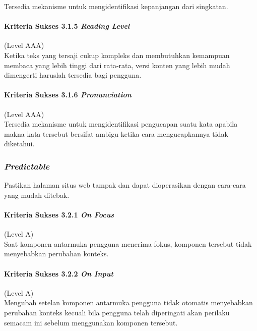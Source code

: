 Tersedia mekanisme untuk mengidentifikasi kepanjangan dari singkatan.

\paragraph{Kriteria Sukses 3.1.5 \textit{Reading Level}}
\label{sec:kriteria_sukses_3.1.5}
(Level AAA)\\

Ketika teks yang tersaji cukup kompleks dan membutuhkan kemampuan membaca yang lebih tinggi dari rata-rata, versi konten yang lebih mudah dimengerti haruslah tersedia bagi pengguna.

\paragraph{Kriteria Sukses 3.1.6 \textit{Pronunciation}}
\label{sec:kriteria_sukses_3.1.6}
(Level AAA)\\

Tersedia mekanisme untuk mengidentifikasi pengucapan suatu kata apabila makna kata tersebut bersifat ambigu ketika cara mengucapkannya tidak diketahui.

\subsubsection{\textit{Predictable}}
\label{sec:predictable}
Pastikan halaman situs web tampak dan dapat dioperasikan dengan cara-cara yang mudah ditebak.

\paragraph{Kriteria Sukses 3.2.1 \textit{On Focus}}
\label{sec:kriteria_sukses_3.2.1}
(Level A)\\

Saat komponen antarmuka pengguna menerima fokus, komponen tersebut tidak menyebabkan perubahan konteks.

\paragraph{Kriteria Sukses 3.2.2 \textit{On Input}}
\label{sec:kriteria_sukses_3.2.2}
(Level A)\\

Mengubah setelan komponen antarmuka pengguna tidak otomatis menyebabkan perubahan konteks kecuali bila pengguna telah diperingati akan perilaku semacam ini sebelum menggunakan komponen tersebut.

